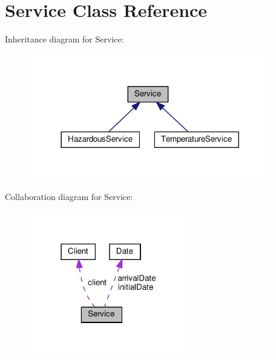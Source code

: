 \hypertarget{class_service}{}\section{Service Class Reference}
\label{class_service}


Inheritance diagram for Service\+:\nopagebreak
\begin{figure}[H]
\begin{center}
\leavevmode
\includegraphics[width=300pt]{class_service__inherit__graph}
\end{center}
\end{figure}


Collaboration diagram for Service\+:\nopagebreak
\begin{figure}[H]
\begin{center}
\leavevmode
\includegraphics[width=198pt]{class_service__coll__graph}
\end{center}
\end{figure}
